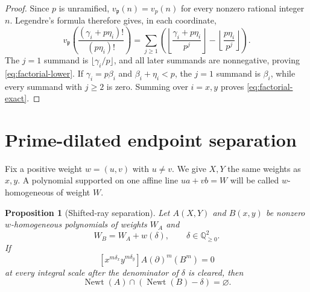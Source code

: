 \documentclass[11pt]{article}
\newtheorem{proposition}[theorem]{Proposition}
\newcommand{\Q}{\mathbb Q}
\newcommand{\Newt}{\operatorname{Newt}}
\begin{document}
\begin{proof}
Since $p$ is unramified,
$v_{\mathfrak p}(n)=v_p(n)$ for every nonzero rational integer $n$.
Legendre's formula therefore gives, in each coordinate,
\[
 v_{\mathfrak p}\!\left(
  \frac{(\gamma_i+p\eta_i)!}{(p\eta_i)!}
 \right)
 =\sum_{j\geq1}\left(
  \left\lfloor\frac{\gamma_i+p\eta_i}{p^j}\right\rfloor-
  \left\lfloor\frac{p\eta_i}{p^j}\right\rfloor
 \right).
\]
The $j=1$ summand is $\lfloor\gamma_i/p\rfloor$, and all later
summands are nonnegative, proving \eqref{eq:factorial-lower}.  If
$\gamma_i=p\beta_i$ and $\beta_i+\eta_i<p$, the $j=1$ summand is
$\beta_i$, while every summand with $j\geq2$ is zero.  Summing over
$i=x,y$ proves \eqref{eq:factorial-exact}.
\end{proof}

\section{Prime-dilated endpoint separation}

Fix a positive weight $w=(u,v)$ with $u\ne v$.  We give $X,Y$ the same
weights as $x,y$.  A polynomial supported on one affine line
$u a+v b=W$ will be called $w$-homogeneous of weight $W$.

\begin{proposition}[Shifted-ray separation]\label{prop:shifted}
Let $A(X,Y)$ and $B(x,y)$ be nonzero $w$-homogeneous polynomials of
weights $W_A$ and
\[
 W_B=W_A+w(\delta),
 \qquad \delta\in\Q_{\geq0}^2.
\]
If
\begin{equation}\label{eq:shifted-vanishing}
 [x^{m\delta_x}y^{m\delta_y}]
 A(\partial)^m(B^m)=0
\end{equation}
at every integral scale after the denominator of $\delta$ is cleared, then
\begin{equation}\label{eq:shifted-disjoint}
 \Newt(A)\cap(\Newt(B)-\delta)=\varnothing.
\end{equation}
\end{proposition}
\end{document}
